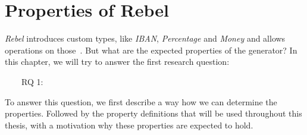 \chapter{Properties of Rebel}
\label{cpt:properties}




\textit{Rebel} introduces custom types, like \textit{IBAN}, \textit{Percentage}
and \textit{Money} and allows operations on those~\cite{stoel2016solving}. But
what are the expected properties of the generator? In this chapter, we will try
to answer the first research question:
\begin{description}
	\item [~~~~RQ 1:] \rqOne
\end{description}
To answer this question, we first describe a way how we can determine the
properties. Followed by the property definitions that will be used throughout
this thesis, with a motivation why these properties are expected to hold.


